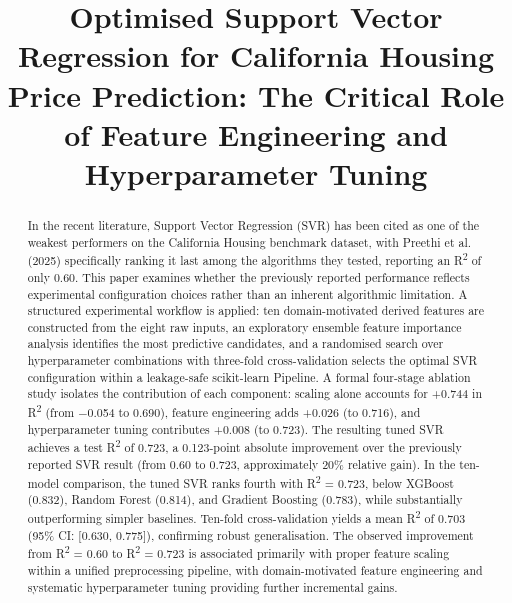 \documentclass[pdflatex,sn-mathphys-num]{sn-jnl}
\begin{document}
\title[SVR California Housing]{Optimised Support Vector Regression for California Housing Price Prediction: The Critical Role of Feature Engineering and Hyperparameter Tuning}

\author*[1]{ }


\maketitle

\begin{abstract}
\noindent In the recent literature, Support Vector Regression (SVR) has been cited as one of the weakest performers on the California Housing benchmark dataset, with Preethi et al. (2025) specifically ranking it last among the algorithms they tested, reporting an R\textsuperscript{2} of only 0.60. This paper examines whether the previously reported performance reflects experimental configuration choices rather than an inherent algorithmic limitation. A structured experimental workflow is applied: ten domain-motivated derived features are constructed from the eight raw inputs, an exploratory ensemble feature importance analysis identifies the most predictive candidates, and a randomised search over hyperparameter combinations with three-fold cross-validation selects the optimal SVR configuration within a leakage-safe scikit-learn Pipeline. A formal four-stage ablation study isolates the contribution of each component: scaling alone accounts for +0.744 in R\textsuperscript{2} (from $-$0.054 to 0.690), feature engineering adds +0.026 (to 0.716), and hyperparameter tuning contributes +0.008 (to 0.723). The resulting tuned SVR achieves a test R\textsuperscript{2} of 0.723, a 0.123-point absolute improvement over the previously reported SVR result (from 0.60 to 0.723, approximately 20\% relative gain). In the ten-model comparison, the tuned SVR ranks fourth with R\textsuperscript{2} = 0.723, below XGBoost (0.832), Random Forest (0.814), and Gradient Boosting (0.783), while substantially outperforming simpler baselines. Ten-fold cross-validation yields a mean R\textsuperscript{2} of 0.703 (95\% CI: [0.630, 0.775]), confirming robust generalisation. The observed improvement from R\textsuperscript{2} = 0.60 to R\textsuperscript{2} = 0.723 is associated primarily with proper feature scaling within a unified preprocessing pipeline, with domain-motivated feature engineering and systematic hyperparameter tuning providing further incremental gains.
\end{abstract}
\end{document}
